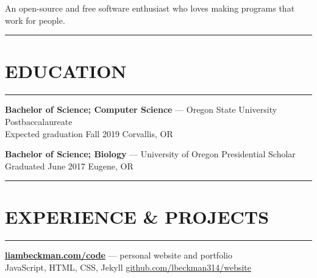 

\usepackage[margin=1.5cm]{geometry}



\maketitle

\begin{center}
An open-source and free software enthusiast who loves making programs that work for people.
\end{center}

\textcolor{my-grey}{\rule{\textwidth}{1pt}\vspace{-1.5em}}
\section*{\large{EDUCATION}}\vspace{-1.5em}
\textcolor{my-grey}{\rule{\linewidth}{1pt}}

\medbreak

\textcolor{my-blue}{\textbf{Bachelor of Science; Computer Science}} --- Oregon State University Postbaccalaureate\\
\textcolor{my-grey}{Expected graduation Fall 2019 \hfill Corvallis, OR}

\textcolor{my-grey}{\dotfill}
\medbreak

\textcolor{my-blue}{\textbf{Bachelor of Science; Biology}} --- University of Oregon Presidential Scholar\\
\textcolor{my-grey}{Graduated June 2017 \hfill Eugene, OR}

\medbreak

\textcolor{my-grey}{\rule{\textwidth}{1pt}\vspace{-1.5em}}
\section*{\large{EXPERIENCE \& PROJECTS}}\vspace{-1.5em}
\textcolor{my-grey}{\rule{\linewidth}{1pt}}

\medbreak

\textcolor{my-blue}{\textbf{\href{https://liambeckman.com}{liambeckman.com/code}}} --- personal website and portfolio\\
\textcolor{my-grey}{JavaScript, HTML, CSS, Jekyll \hfill \href{https://github.com/lbeckman314/website}{github.com/lbeckman314/website}}\\

